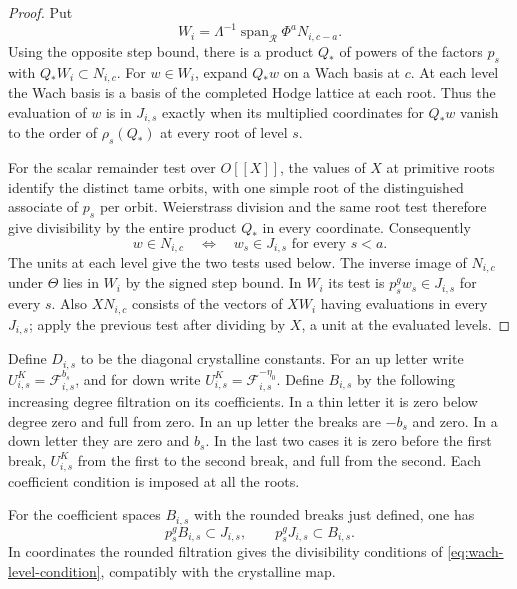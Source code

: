 \begin{proof}
Put
\[
 W_i=\Lambda^{-1}\operatorname{span}_{\mathcal R} \Phi^aN_{i,c-a}.
\]
Using the opposite step bound, there is a product
\(Q_*\) of powers of the factors \(p_s\) with \(Q_*W_i\subset N_{i,c}\).
For \(w\in W_i\), expand \(Q_*w\) on a Wach basis at \(c\).
At each level the Wach basis is a basis of the completed Hodge
lattice at each root. Thus the evaluation of \(w\) is in \(J_{i,s}\)
exactly when its multiplied coordinates for \(Q_*w\) vanish to the
order of \(\rho_s(Q_*)\) at every root of level \(s\).

For the scalar
remainder test over \(O[[X]]\), the values of \(X\) at primitive
roots identify the distinct tame orbits, with one simple root of the
distinguished associate of \(p_s\) per orbit. Weierstrass division
and the same root test therefore give divisibility by the entire
product \(Q_*\) in every coordinate. Consequently
\[
       w\in N_{i,c}\quad\Longleftrightarrow\quad
       w_s\in J_{i,s}\text{ for every }s<a .
\]
The units at each level give the two tests used below. The inverse
image of \(N_{i,c}\) under \(\Theta\) lies in \(W_i\) by the signed
step bound. In \(W_i\) its test is \(p_s^g w_s\in J_{i,s}\)
for every \(s\). Also \(XN_{i,c}\) consists of the vectors of
\(XW_i\) having evaluations in every \(J_{i,s}\); apply the
previous test after dividing by \(X\), a unit at the evaluated
levels.
\end{proof}

Define \(D_{i,s}\) to be the diagonal crystalline constants.
For an up letter write \(U^K_{i,s}=\mathcal F_{i,s}^{b_s}\),
and for down write \(U^K_{i,s}=\mathcal F_{i,s}^{-\eta_0}\).
Define \(B_{i,s}\) by the following increasing degree filtration
on its coefficients. In a thin letter it is zero below degree
zero and full from zero. In an up letter the breaks are \(-b_s\)
and zero. In a down letter they are zero and \(b_s\). In the
last two cases it is zero before the first break, \(U^K_{i,s}\)
from the first to the second break, and full from the second.
Each coefficient condition is imposed at all the roots.

\begin{lemma}\label{lem:wach-rounded-breaks}
For the coefficient spaces \(B_{i,s}\) with the rounded breaks
just defined, one has
\[
 p_s^gB_{i,s}\subset J_{i,s},\qquad p_s^gJ_{i,s}\subset B_{i,s}.
\]
In coordinates the rounded filtration gives the divisibility conditions
of \eqref{eq:wach-level-condition}, compatibly with the crystalline map.
\end{lemma}

